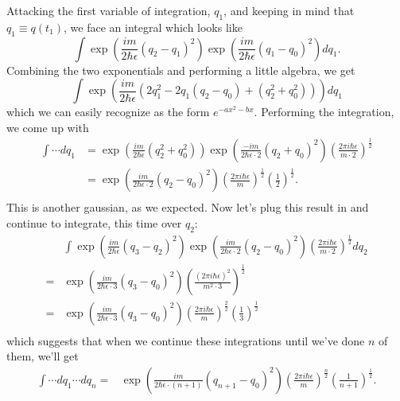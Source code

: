 \documentclass{amsart}
\newcommand{\md}{d}		%
\newcommand{\qv}{q}
\begin{document}
Attacking the first variable of integration, $\qv_1$, and keeping in mind that $\qv_1 \equiv \qv(t_1)$, we face an integral which looks like
\begin{equation*}
\int \exp{\left( \frac{i m}{2 \hbar \epsilon} \left(\qv_2 - \qv_1\right)^2 \right)}\exp{\left( \frac{i m}{2 \hbar \epsilon} \left(\qv_1 - \qv_0\right)^2 \right)} \md \qv_1.
\end{equation*}
Combining the two exponentials and performing a little algebra, we get
\begin{equation*}
\int \exp{\left( \frac{i m}{2 \hbar \epsilon} \left(2\qv_1^2 - 2\qv_1(\qv_2 - \qv_0) + (\qv_2^2 + \qv_0^2)\right) \right)} \md \qv_1
\end{equation*}
which we can easily recognize as the form $e^{-ax^2-bx}$.  Performing the integration, we come up with
\begin{align*}
\int \cdots \md \qv_1 
	& = \exp{\left( \frac{i m}{2 \hbar \epsilon}(\qv_2^2 + \qv_0^2) \right)} \exp{\left( \frac{- i m}{2 \hbar \epsilon \cdot 2} (\qv_2 + \qv_0)^2 \right)} \left( \frac{2 \pi i \hbar \epsilon}{m \cdot 2}\right)^{\frac{1}{2}}\\
	& = \exp{\left( \frac{i m}{2 \hbar \epsilon \cdot 2} (\qv_2 - \qv_0)^2 \right)} \left( \frac{2 \pi i \hbar \epsilon}{m}\right)^{\frac{1}{2}}\left(\frac{1}{2}\right)^{\frac{1}{2}}.\\
\end{align*}
This is another gaussian, as we expected.  Now let's plug this result in and continue to integrate, this time over $\qv_2$:
\begin{align*}
&\int \exp{\left( \frac{i m}{2 \hbar \epsilon} \left(\qv_3 - \qv_2\right)^2 \right)}\exp{\left( \frac{i m}{2 \hbar \epsilon \cdot 2} (\qv_2 - \qv_0)^2 \right)} \left( \frac{2 \pi i \hbar \epsilon}{m \cdot 2}\right)^{\frac{1}{2}} \md \qv_2\\
=& \exp{\left( \frac{i m}{2 \hbar \epsilon \cdot 3} (\qv_3 - \qv_0)^2 \right)} \left( \frac{(2 \pi i \hbar \epsilon)^2}{m^2 \cdot 3}\right)^{\frac{1}{2}}\\
=& \exp{\left( \frac{i m}{2 \hbar \epsilon \cdot 3} (\qv_3 - \qv_0)^2 \right)} \left( \frac{2 \pi i \hbar \epsilon}{m}\right)^{\frac{2}{2}}\left(\frac{1}{3}\right)^{\frac{1}{2}}\\
\end{align*}
which suggests that when we continue these integrations until we've done $n$ of them, we'll get
\begin{align*}
\int \cdots \md \qv_1 \cdots \md \qv_n 
	=& \exp{\left( \frac{i m}{2 \hbar \epsilon \cdot (n+1)} (\qv_{n+1} - \qv_0)^2 \right)} \left( \frac{2 \pi i \hbar \epsilon}{m}\right)^{\frac{n}{2}}\left(\frac{1}{n+1}\right)^{\frac{1}{2}}.\\
\end{align*}
\end{document}
